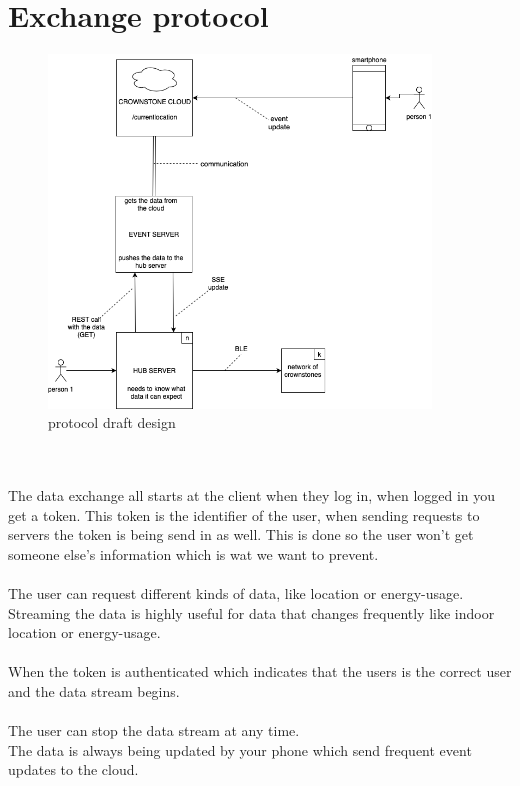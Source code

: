 \documentclass{article}
\begin{document}
\cleardoublepage
\section{Exchange protocol}

\label{fig:protocolDraft}	
	\begin{figure}[H]
	\includegraphics[width=4in]{pictures/prototypeV3.png}
	\caption[Optional caption]{protocol draft design}
	\end{figure}\\
\\
The data exchange all starts at the client when they log in, when logged in you get a token. This token is the identifier of the user, when sending requests to servers the token is being send in as well. This is done so the user won't get someone else's information which is wat we want to prevent. \\
\\
The user can request different kinds of data, like location or energy-usage. Streaming the data is highly useful for data that changes frequently like indoor location or energy-usage. \\
\\
When the token is authenticated which indicates that the users is the correct user and the data stream begins.\\ 
\\
The user can stop the data stream at any time. 
\\
The data is always being updated by your phone which send frequent event updates to the cloud. 
\end{document}
